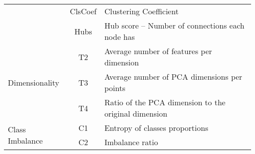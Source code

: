 \begin{table}[t!]
\begin{tabular}{l|c|p{5cm}}
                                     & ClsCoef     & Clustering Coefficient                                \\
                                     & Hubs     & Hub score -- Number of connections each node has         \\
    \midrule
    \multirow{3}{*}{Dimensionality}  & T2     & Average number of features per dimension                   \\
                                     & T3     & Average number of PCA dimensions per points                \\
                                     & T4     & Ratio of the PCA dimension to the original dimension       \\
    \midrule
    \multirow{2}{*}{Class Imbalance} & C1     & Entropy of classes proportions                             \\
                                     & C2     & Imbalance ratio                                            \\ 
    \bottomrule
    \end{tabular}
    \label{tab.cmeasure}
\end{table}

